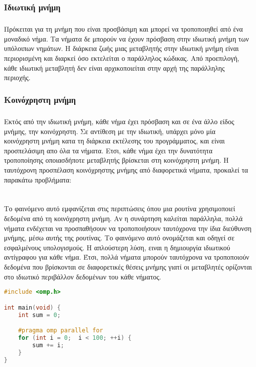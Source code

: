 \subsubsection{Ιδιωτική μνήμη}
\subparagraph{}
Πρόκειται για τη μνήμη που είναι προσβάσιμη και μπορεί να τροποποιηθεί από ένα μοναδικό νήμα. Τα νήματα δε μπορούν να έχουν πρόσβαση στην ιδιωτική μνήμη των υπόλοιπων νημάτων. Η διάρκεια ζωής μιας μεταβλητής στην ιδιωτική μνήμη είναι περιορισμένη και διαρκεί όσο εκτελείται ο παράλληλος κώδικας. Από προεπιλογή, κάθε ιδιωτική μεταβλητή δεν είναι αρχικοποιείται στην αρχή της παράλληλης περιοχής\cite{thenextstep9}.

\clearpage
\subsubsection{Κοινόχρηστη μνήμη}
\subparagraph{}
Εκτός από την ιδιωτική μνήμη, κάθε νήμα έχει πρόσβαση και σε ένα άλλο είδος μνήμης, την  κοινόχρηστη. Σε αντίθεση με την ιδιωτική, υπάρχει μόνο μία κοινόχρηστη μνήμη κατα τη διάρκεια εκτέλεσης του προγράμματος, και είναι προσπελάσιμη απο όλα τα νήματα. Ετσι, κάθε νήμα έχει την δυνατότητα τροποποίησης οποιασδήποτε μεταβλητής βρίσκεται στη κοινόχρηστη μνήμη.
Η ταυτόχρονη προσπέλαση κοινόχρηστης μνήμης από διαφορετικά νήματα, προκαλεί τα παρακάτω προβλήματα:
\clearpage
\paragraph{}
\begin{center}
	\begin{minipage}[t]{0.45\linewidth}
\ \\
	Το φαινόμενο αυτό εμφανίζεται στις περιπτώσεις όπου μια ρουτίνα χρησιμοποιεί δεδομένα από τη κοινόχρηστη μνήμη. 
Αν η συνάρτηση καλείται παράλληλα, πολλά νήματα ενδέχεται να προσπαθήσουν να τροποποιήσουν ταυτόχρονα την ίδια διεύθυνση μνήμης, μέσω αυτής της ρουτίνας. Το φαινόμενο αυτό ονομάζεται \emph{} και οδηγεί σε εσφαλμένους υπολογισμούς. Η απλούστερη λύση, ειναι η δημιουργία ιδιωτικού αντίγραφου για κάθε νήμα. Έτσι, πολλά νήματα μπορούν ταυτόχρονα να τροποποιούν δεδομένα που βρίσκονται σε διαφορετικές θέσεις μνήμης γιατί οι μεταβλητές ορίζονται στο ιδιωτικό περιβάλλον δεδομένων του κάθε νήματος.
	\end{minipage}
	\qquad
	\begin{minipage}[t]{0.47\linewidth}
		\begin{lstlisting}[tabsize=2, basicstyle=\small, language=C++, caption={\el{Παράδειγμα κώδικα με} race condition}, frame=tb]
#include <omp.h>

int main(void) {	
	int sum = 0;

	#pragma omp parallel for
	for (int i = 0;  i < 100; ++i) {
		sum += i;		
	}
}
\end{lstlisting}
	\end{minipage}
\end{center}
\ \\
\clearpage
